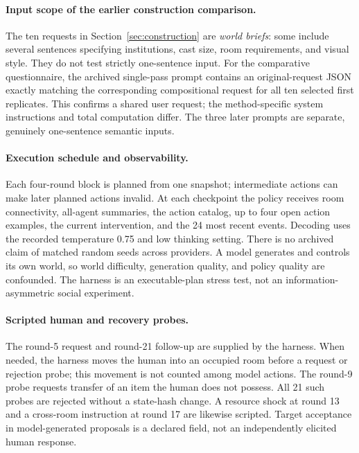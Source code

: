 \paragraph{Input scope of the earlier construction comparison.}
The ten requests in Section~\ref{sec:construction} are \emph{world briefs}:
some include several sentences specifying institutions, cast size, room
requirements, and visual style. They do not test strictly one-sentence input.
For the comparative questionnaire, the archived single-pass prompt contains
an original-request JSON exactly matching the corresponding compositional
request for all ten selected first replicates. This confirms a shared user
request; the method-specific system instructions and total computation differ.
The three later prompts are separate, genuinely one-sentence semantic inputs.

\paragraph{Execution schedule and observability.}
Each four-round block is planned from one snapshot; intermediate actions can
make later planned actions invalid. At each checkpoint the policy receives
room connectivity, all-agent summaries, the action catalog, up to four open
action examples, the current intervention, and the 24 most recent events.
Decoding uses the recorded temperature 0.75 and low thinking setting. There is
no archived claim of matched random seeds across providers. A model generates
and controls its own world, so world difficulty, generation quality, and
policy quality are confounded. The harness is an executable-plan stress test,
not an information-asymmetric social experiment.

\paragraph{Scripted human and recovery probes.}
The round-5 request and round-21 follow-up are supplied by the harness.
When needed, the harness moves the human into an occupied room before a
request or rejection probe; this movement is not counted among model actions.
The round-9 probe requests transfer of an item the human does not possess.
All 21 such probes are rejected without a state-hash change. A resource shock
at round 13 and a cross-room instruction at round 17 are likewise scripted.
Target acceptance in model-generated proposals is a declared field, not an
independently elicited human response.

